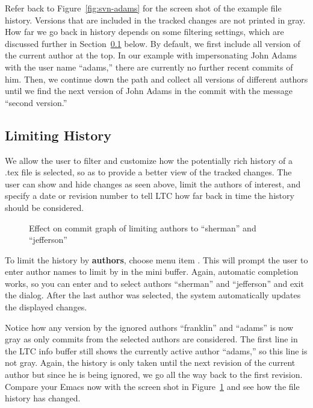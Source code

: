 Refer back to Figure~\ref{fig:svn-adams} for the screen shot of the example file history. Versions that are included in the tracked changes are not printed in gray.  How far we go back in history depends on some filtering settings, which are discussed further in Section~\ref{sec:svn-emacs-limit-history} below.  By default, we first include all version of the current author at the top.  In our example with impersonating John Adams with the user name ``adams,'' there are currently no further recent commits of him.  Then, we continue down the path and collect all versions of different authors until we find the next version of John Adams in the commit with the message ``second version.''

\subsection{Limiting History} \label{sec:svn-emacs-limit-history}

We allow the user to filter and customize how the potentially rich history of a .tex file is selected, so as to provide a better view of the tracked changes.  The user can show and hide changes as seen above, limit the authors of interest, and specify a date or revision number to tell LTC how far back in time the history should be considered.

\begin{figure}
\centering
{}
\caption[Effect on commit graph of limiting authors]{Effect on commit graph of limiting authors to ``sherman'' and ``jefferson''} \label{fig:svn-emacs-limit-authors}
\end{figure}
To limit the history by \textbf{authors}, choose menu item . This will prompt the user to enter author names to limit by in the mini buffer.  Again, automatic completion works, so you can enter  and  to select authors ``sherman'' and ``jefferson'' and exit the dialog.  After the last author was selected, the system automatically updates the displayed changes.

Notice how any version by the ignored authors ``franklin'' and ``adams'' is now gray as only commits from the selected authors are considered.  The first line in the LTC info buffer still shows the currently active author ``adams,'' so this line is not gray.  Again, the history is only taken until the next revision of the current author but since he is being ignored, we go all the way back to the first revision. Compare your Emacs now with the screen shot in Figure~\ref{fig:svn-emacs-limit-authors} and see how the file history has changed.

